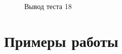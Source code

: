 \documentclass[12pt, a4paper]{article}
\begin{document}
\begin{enumerate}
\begin{figure}[h]
  		\caption{Вывод теста 18}
	\end{figure}
\end{enumerate}
\newpage
\section{Примеры работы}
\end{document}
